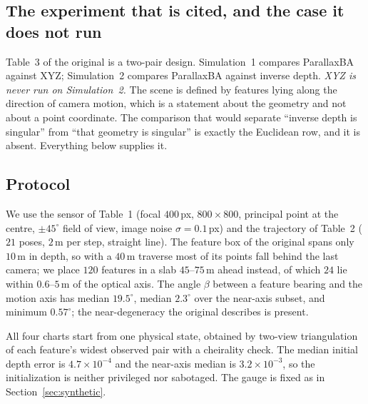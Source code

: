 \documentclass[11pt,a4paper]{article}
\theoremstyle{definition}
\theoremstyle{remark}
\begin{document}
\subsection{The experiment that is cited, and the case it does not run}
Table~3 of the original is a two-pair design. Simulation~1 compares ParallaxBA against XYZ; Simulation~2 compares ParallaxBA against inverse depth. \emph{XYZ is never run on Simulation~2.} The scene is defined by features lying along the direction of camera motion, which is a statement about the geometry and not about a point coordinate. The comparison that would separate ``inverse depth is singular'' from ``that geometry is singular'' is exactly the Euclidean row, and it is absent. Everything below supplies it.

\subsection{Protocol}
We use the sensor of Table~1 (focal $400$\,px, $800\times800$, principal point at the centre, $\pm45^\circ$ field of view, image noise $\sigma=0.1$\,px) and the trajectory of Table~2 ($21$ poses, $2$\,m per step, straight line). The feature box of the original spans only $10$\,m in depth, so with a $40$\,m traverse most of its points fall behind the last camera; we place $120$ features in a slab $45$--$75$\,m ahead instead, of which $24$ lie within $0.6$--$5$\,m of the optical axis. The angle $\beta$ between a feature bearing and the motion axis has median $19.5^\circ$, median $2.3^\circ$ over the near-axis subset, and minimum $0.57^\circ$; the near-degeneracy the original describes is present.

All four charts start from one physical state, obtained by two-view triangulation of each feature's widest observed pair with a cheirality check. The median initial depth error is $4.7\times10^{-4}$ and the near-axis median is $3.2\times10^{-3}$, so the initialization is neither privileged nor sabotaged. The gauge is fixed as in Section~\ref{sec:synthetic}.
\end{document}
